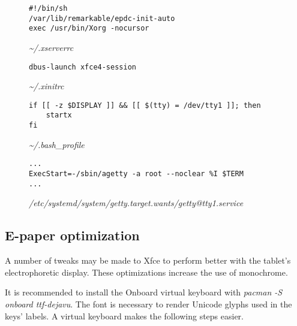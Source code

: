 \documentclass{memoir}
\begin{document}
\pagebreak
\begin{figure}[h]
\begin{verbatim}
#!/bin/sh
/var/lib/remarkable/epdc-init-auto
exec /usr/bin/Xorg -nocursor
\end{verbatim}
\caption{\textit{\textasciitilde/.xserverrc}}
\label{fig:xserverrc}
\end{figure}

\begin{figure}[h]
\begin{verbatim}
dbus-launch xfce4-session
\end{verbatim}
\caption{\textit{\textasciitilde/.xinitrc}}
\label{fig:xinitrc}
\end{figure}

\begin{figure}[h]
\begin{verbatim}
if [[ -z $DISPLAY ]] && [[ $(tty) = /dev/tty1 ]]; then
    startx
fi
\end{verbatim}
\caption{\textit{\textasciitilde/.bash\_profile}}
\label{fig:bash_profile}
\end{figure}

\begin{figure}[h]
\begin{verbatim}
...
ExecStart=-/sbin/agetty -a root --noclear %I $TERM
...
\end{verbatim}
\caption{\textit{/etc/systemd/system/getty.target.wants/getty@tty1.service}}
\label{fig:tty1login}
\end{figure}




\subsection{E-paper optimization}
A number of tweaks may be made to Xfce to perform better with the tablet's electrophoretic display. These optimizations increase the use of monochrome.

It is recommended to install the Onboard virtual keyboard with \textit{pacman -S onboard ttf-dejavu}. The font is necessary to render Unicode glyphs used in the keys' labels. A virtual keyboard makes the following steps easier.
\end{document}
